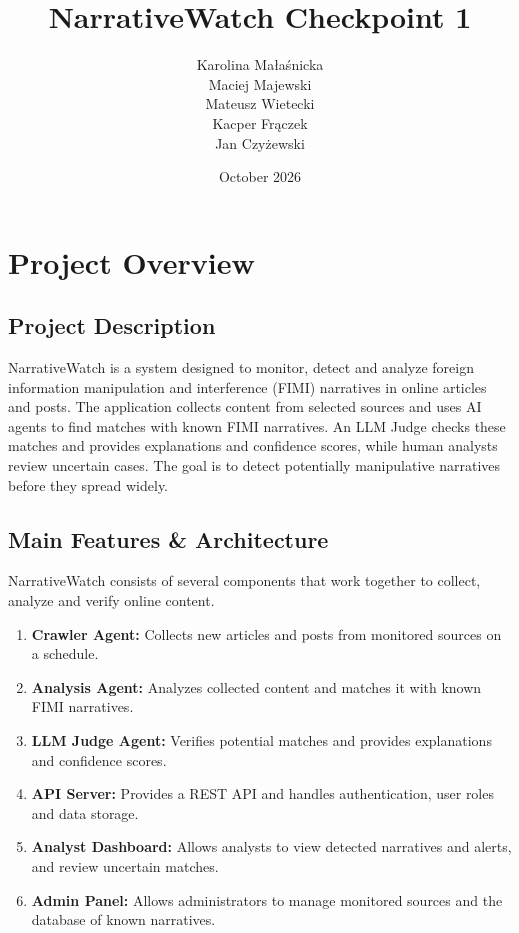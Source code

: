 \documentclass[12pt,a4paper]{article}
\title{\textbf{NarrativeWatch} Checkpoint 1}
\author{
    Karolina Małaśnicka \\
    Maciej Majewski \\
    Mateusz Wietecki \\
    Kacper Frączek \\
    Jan Czyżewski
}
\date{October 2026}
\begin{document}
\maketitle
\vspace{-1.5cm}
\tableofcontents
\newpage

\section{Project Overview}

\subsection{Project Description}
NarrativeWatch is a system designed to monitor, detect and analyze foreign information manipulation and interference (FIMI) narratives in online articles and posts. The application collects content from selected sources and uses AI agents to find matches with known FIMI narratives. An LLM Judge checks these matches and provides explanations and confidence scores, while human analysts review uncertain cases. The goal is to detect potentially manipulative narratives before they spread widely.

\subsection{Main Features \& Architecture}
NarrativeWatch consists of several components that work together to collect, analyze and verify online content.

\begin{enumerate}
    \item \textbf{Crawler Agent:} Collects new articles and posts from monitored sources on a schedule.
    \item \textbf{Analysis Agent:} Analyzes collected content and matches it with known FIMI narratives.
    \item \textbf{LLM Judge Agent:} Verifies potential matches and provides explanations and confidence scores.
    \item \textbf{API Server:} Provides a REST API and handles authentication, user roles and data storage.
    \item \textbf{Analyst Dashboard:} Allows analysts to view detected narratives and alerts, and review uncertain matches.
    \item \textbf{Admin Panel:} Allows administrators to manage monitored sources and the database of known narratives.
\end{enumerate}
\end{document}
